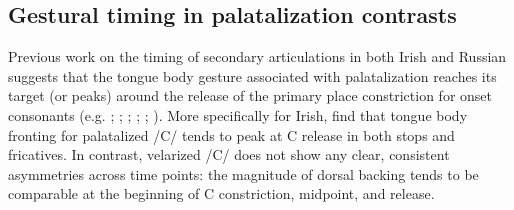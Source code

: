\documentclass[output=paper,colorlinks,citecolor=brown]{langscibook}
\newcommand{\pal}{\ipa{ʲ}}
\newcommand{\vel}{\ipa{ˠ}}
\begin{document}


\subsection{Gestural timing in palatalization contrasts}\label{sec:timing}
Previous work on the timing of secondary articulations in both Irish and Russian suggests that the tongue body gesture associated with palatalization reaches its target (or peaks) around the release of the primary place constriction for onset consonants (e.g. \citealt[Ch.10]{Ladefoged_Maddieson1996_SOWL}; \citealt{Kochetov2002_diss}; \citeyear{Kochetov2006_syll_poss}; \cite{Iskarous_Kavitskaya2010_phonetic_variability}; \cite{Bennett_etal2018_Conamara_ultrasound}; \cite{Padgett_etal2023_Irish_pal_syllpos}). More specifically for Irish, \citet{Bennett_etal2018_Conamara_ultrasound} find that tongue body fronting for palatalized /C\pal/ tends to peak at C release in both stops and fricatives. In contrast, velarized /C\vel/ does not show any clear, consistent asymmetries across time points: the magnitude of dorsal backing tends to be comparable at the beginning of C constriction, midpoint, and release. 
\end{document}
